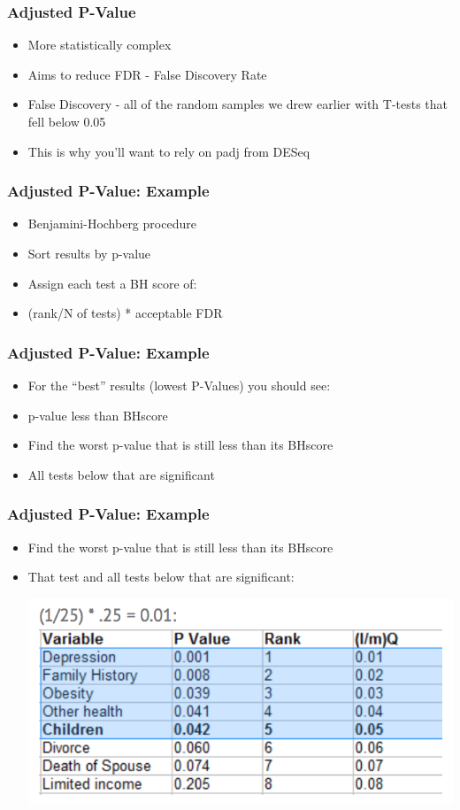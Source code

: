 \documentclass[14pt,handout]{beamer}
\begin{document}
\begin{frame}
\frametitle{Adjusted P-Value}
\begin{itemize}
	\item<+-> More statistically complex
	\item<+-> Aims to reduce FDR - False Discovery Rate
	\item<+-> False Discovery - all of the random samples we drew earlier with T-tests that fell below 0.05
	\item<+-> This is why you'll want to rely on padj from DESeq
\end{itemize}
\end{frame}

\begin{frame}
\frametitle{Adjusted P-Value: Example}
\begin{itemize}
	\item<+-> Benjamini-Hochberg procedure
	\item<+-> Sort results by p-value
	\item<+-> Assign each test a BH score of:
	\item<+-> (rank/N of tests) * acceptable FDR
\end{itemize}
\end{frame}

\begin{frame}
\frametitle{Adjusted P-Value: Example}
\begin{itemize}
	\item<+-> For the ``best'' results (lowest P-Values) you should see:
	\item<+-> p-value less than BHscore
	\item<+-> Find the worst p-value that is still less than its BHscore
	\item<+-> All tests below that are significant
\end{itemize}
\end{frame}

\begin{frame}
\frametitle{Adjusted P-Value: Example}
\begin{itemize}
	\item Find the worst p-value that is still less than its BHscore
	\item That test and all tests below that are significant:
	\begin{center}
	\includegraphics[width=.7\textwidth]{images_20171128_BHscore.png}
	\end{center}
\end{itemize}
\end{frame}
\end{document}
